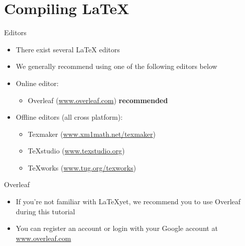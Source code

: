 \documentclass{beamer}
\begin{document}
\section{Compiling LaTeX}
\begin{frame}{Editors}
    \begin{itemize}
        \item There exist several \LaTeX{} editors
        \item We generally recommend using one of the following editors below
        \item Online editor:
              \begin{itemize}
                  \item Overleaf (\url{www.overleaf.com}) \hspace{2pt} \textbf{recommended}
              \end{itemize}
        \item Offline editors (all cross platform):
              \begin{itemize}
                  \item Texmaker (\url{www.xm1math.net/texmaker})
                  \item TeXstudio (\url{www.texstudio.org})
                  \item TeXworks (\url{www.tug.org/texworks})
              \end{itemize}
    \end{itemize}
\end{frame}

\begin{frame}{Overleaf}
    \begin{itemize}
        \item If you're not familiar with \LaTeX yet, we recommend you to use Overleaf during this tutorial
        \item You can register an account or login with your Google account at \url{www.overleaf.com}
    \end{itemize}
\end{frame}
\end{document}
